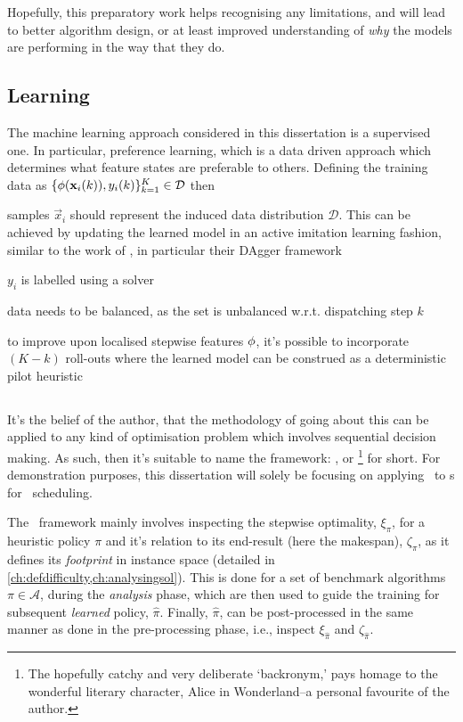 Hopefully, this preparatory work helps recognising any limitations, and will 
lead to better algorithm design, or at least improved understanding of 
\emph{why} the models are performing in the way that they do.

\subsection*{Learning}
The machine learning approach considered in this dissertation is a supervised one. In particular, preference learning, which is a data driven approach which determines what feature states are preferable to others.
Defining the training data as 
$\{{\mathbf{\phi}}(\mathbf{x}_i(k)),y_i(k)\}_{k=1}^K\in\mathcal{D}$ then 
\begin{enumerate*}
    \item samples $\vec{x}_i$ should represent the induced data distribution $\mathcal{D}$. 
    This can be achieved by updating the learned model in an active imitation learning fashion, similar to the work of \cite{RossB10,RossGB11}, in particular their DAgger framework
    \item $y_i$ is labelled using a solver
    \item data needs to be balanced, as the set is unbalanced w.r.t. 
    dispatching step $k$
    \item to improve upon localised stepwise features ${\mathbf{\phi}}$, it's possible to 
    incorporate $(K-k)$ roll-outs where the learned model can be construed as a 
    deterministic pilot heuristic    
\end{enumerate*}


\subsection*{\Alice}
It's the belief of the author, that the methodology of going about this can be 
applied to any kind of optimisation problem which involves sequential decision 
making. As such, then it's suitable to name the framework:
\emph{\fullnameAlice}, or \Alice\footnote{
    The hopefully catchy and very deliberate `backronym,' pays homage to 
    the wonderful literary character, Alice in Wonderland--a personal 
    favourite of the author.} 
for short. 
For demonstration purposes, this dissertation will solely be 
focusing on applying \Alice\ to \dr s for \jsp\ scheduling.

The \Alice\ framework mainly involves inspecting the stepwise optimality, $\xi_\pi$, for a heuristic policy $\pi$ and it's relation to its end-result (here the makespan), $\zeta_{\pi}$, as it defines its \emph{footprint} in instance space (detailed in \cref{ch:defdifficulty,ch:analysingsol}). 
This is done for a set of benchmark algorithms $\pi\in\mathcal{A}$, during the 
\emph{analysis} phase, which are then used to guide the training 
for subsequent \emph{learned} policy, $\hat{\pi}$. 
Finally, $\hat{\pi}$, can be post-processed in the same manner as done in the 
pre-processing phase, i.e., inspect $\xi_{\hat{\pi}}$ and $\zeta_{\hat{\pi}}$.

